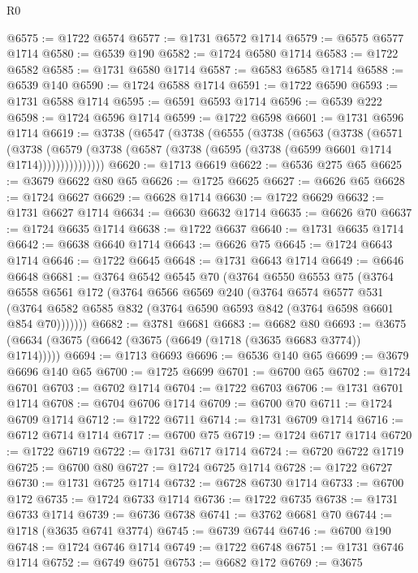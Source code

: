 \begin{lexlean}{R0}
\begin{coremodule}
@6575 := @1722 @6574
@6577 := @1731 @6572 @1714
@6579 := @6575 @6577 @1714
@6580 := @6539 @190
@6582 := @1724 @6580 @1714
@6583 := @1722 @6582
@6585 := @1731 @6580 @1714
@6587 := @6583 @6585 @1714
@6588 := @6539 @140
@6590 := @1724 @6588 @1714
@6591 := @1722 @6590
@6593 := @1731 @6588 @1714
@6595 := @6591 @6593 @1714
@6596 := @6539 @222
@6598 := @1724 @6596 @1714
@6599 := @1722 @6598
@6601 := @1731 @6596 @1714
@6619 := @3738
    (@6547
      (@3738
        (@6555
          (@3738
            (@6563
              (@3738
                (@6571
                  (@3738
                    (@6579
                      (@3738 (@6587 (@3738 (@6595 (@3738 (@6599 @6601 @1714 @1714)))))))))))))))
@6620 := @1713 @6619
@6622 := @6536 @275 @65
@6625 := @3679 @6622 @80 @65
@6626 := @1725 @6625
@6627 := @6626 @65
@6628 := @1724 @6627
@6629 := @6628 @1714
@6630 := @1722 @6629
@6632 := @1731 @6627 @1714
@6634 := @6630 @6632 @1714
@6635 := @6626 @70
@6637 := @1724 @6635 @1714
@6638 := @1722 @6637
@6640 := @1731 @6635 @1714
@6642 := @6638 @6640 @1714
@6643 := @6626 @75
@6645 := @1724 @6643 @1714
@6646 := @1722 @6645
@6648 := @1731 @6643 @1714
@6649 := @6646 @6648
@6681 := @3764
    @6542
    @6545
    @70
    (@3764
      @6550
      @6553
      @75
      (@3764
        @6558
        @6561
        @172
        (@3764
          @6566
          @6569
          @240
          (@3764
            @6574
            @6577
            @531
            (@3764 @6582 @6585 @832 (@3764 @6590 @6593 @842 (@3764 @6598 @6601 @854 @70)))))))
@6682 := @3781 @6681
@6683 := @6682 @80
@6693 := @3675 (@6634 (@3675 (@6642 (@3675 (@6649 (@1718 (@3635 @6683 @3774)) @1714)))))
@6694 := @1713 @6693
@6696 := @6536 @140 @65
@6699 := @3679 @6696 @140 @65
@6700 := @1725 @6699
@6701 := @6700 @65
@6702 := @1724 @6701
@6703 := @6702 @1714
@6704 := @1722 @6703
@6706 := @1731 @6701 @1714
@6708 := @6704 @6706 @1714
@6709 := @6700 @70
@6711 := @1724 @6709 @1714
@6712 := @1722 @6711
@6714 := @1731 @6709 @1714
@6716 := @6712 @6714 @1714
@6717 := @6700 @75
@6719 := @1724 @6717 @1714
@6720 := @1722 @6719
@6722 := @1731 @6717 @1714
@6724 := @6720 @6722 @1719
@6725 := @6700 @80
@6727 := @1724 @6725 @1714
@6728 := @1722 @6727
@6730 := @1731 @6725 @1714
@6732 := @6728 @6730 @1714
@6733 := @6700 @172
@6735 := @1724 @6733 @1714
@6736 := @1722 @6735
@6738 := @1731 @6733 @1714
@6739 := @6736 @6738
@6741 := @3762 @6681 @70
@6744 := @1718 (@3635 @6741 @3774)
@6745 := @6739 @6744
@6746 := @6700 @190
@6748 := @1724 @6746 @1714
@6749 := @1722 @6748
@6751 := @1731 @6746 @1714
@6752 := @6749 @6751
@6753 := @6682 @172
@6769 := @3675

\end{coremodule}
\end{lexlean}
